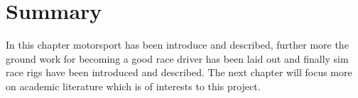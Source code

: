 \section{Summary}
In this chapter motorsport has been introduce and described, further more the ground work for becoming a good race driver has been laid out and finally sim race rigs have been introduced and described. The next chapter will focus more on academic literature which is of interests to this project.